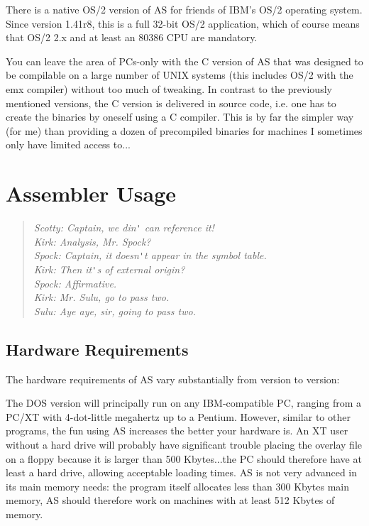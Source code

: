 \documentclass[12pt,twoside]{report}
\newcommand{\asname}{{AS}}
\begin{document}
There is a native OS/2  version of \asname{} for friends of
IBM's OS/2 operating system.  Since version 1.41r8, this is a full 32-bit
OS/2 application, which of course means that OS/2 2.x and at least an
80386 CPU are mandatory.

You can leave  the area of PCs-only with the C
version of \asname{} that was designed to be compilable on a large number of UNIX
systems (this includes OS/2 with the emx compiler) without too much of
tweaking.  In contrast to the previously mentioned versions, the C version
is delivered in source code, i.e. one has to create the binaries by
oneself using a C compiler.  This is by far the simpler way (for me) than
providing a dozen of precompiled binaries for machines I sometimes only
have limited access to...


\cleardoublepage
\chapter{Assembler Usage}

\begin{quote}\begin{raggedright}{\it
Scotty: Captain, we din\verb!'! can reference it! \\
Kirk:   Analysis, Mr. Spock? \\
Spock:  Captain, it doesn\verb!'!t appear in the symbol table. \\
Kirk:   Then it\verb!'!s of external origin? \\
Spock:  Affirmative. \\
Kirk:   Mr. Sulu, go to pass two. \\
Sulu:   Aye aye, sir, going to pass two. \\
}\end{raggedright}\end{quote}


\section{Hardware Requirements}

The hardware requirements of \asname{} vary substantially from version to
version:

The DOS version  will principally run on any
IBM-compatible PC, ranging from a PC/XT with 4-dot-little megahertz up to
a Pentium.  However, similar to other programs, the fun using \asname{} increases
the better your hardware is.  An XT user without a hard drive will
probably have significant trouble placing the overlay file on a floppy
because it is larger than 500 Kbytes...the PC should therefore have at
least a hard drive, allowing acceptable loading times.  \asname{} is not very
advanced in its main memory needs: the program itself allocates less than
300 Kbytes main memory, \asname{} should therefore work on machines with at least
512 Kbytes of memory.
\end{document}
